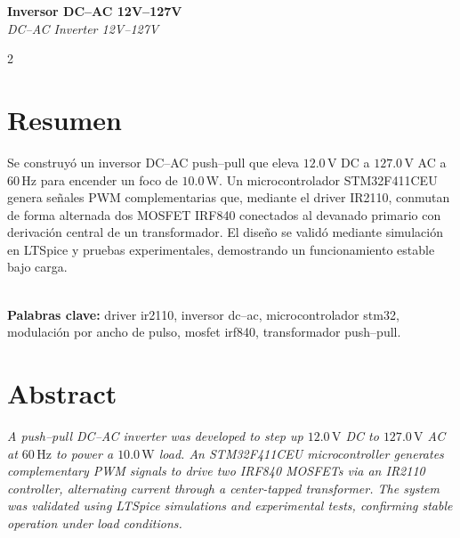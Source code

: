 \documentclass[12pt,a4paper]{article}
\begin{document}
\begin{center}
  {\fontsize{16}{18}\bfseries Inversor DC--AC 12V--127V}\\[0.5cm]
  {\fontsize{14}{16}\itshape DC--AC Inverter 12V--127V}\\[1cm] 
  
  \begin{multicols}{2}



  \end{multicols}
\end{center}

\section*{Resumen}

Se construyó un inversor DC--AC push--pull que eleva $12{.}0\,\mathrm{V}$ DC a $127{.}0\,\mathrm{V}$ AC a $60\,\mathrm{Hz}$ para encender un foco de $10{.}0\,\mathrm{W}$. Un microcontrolador STM32F411CEU genera señales PWM complementarias que, mediante el driver IR2110, conmutan de forma alternada dos MOSFET IRF840 conectados al devanado primario con derivación central de un transformador. El diseño se validó mediante simulación en LTSpice y pruebas experimentales, demostrando un funcionamiento estable bajo carga.

\\

\noindent \textbf{Palabras clave:} driver ir2110, inversor dc--ac, microcontrolador stm32, modulación por ancho de pulso, mosfet irf840, transformador push--pull.

\section*{Abstract}

\emph{A push--pull DC--AC inverter was developed to step up $12{.}0\,\mathrm{V}$ DC to $127{.}0\,\mathrm{V}$ AC at $60\,\mathrm{Hz}$ to power a $10{.}0\,\mathrm{W}$ load. An STM32F411CEU microcontroller generates complementary PWM signals to drive two IRF840 MOSFETs via an IR2110 controller, alternating current through a center-tapped transformer. The system was validated using LTSpice simulations and experimental tests, confirming stable operation under load conditions.}
\end{document}
